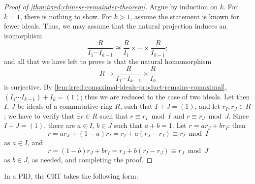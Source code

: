 \begin{proof}[Proof of \cref{thm:irred:chinese-remainder-theorem}]
  Argue by induction on $k$. For $k = 1$, there is nothing to
  show. For $k > 1$, assume the statement is known for fewer
  ideals. Thus, we may assume that the natural projection induces an
  isomorphism
  \[\frac{R}{I_1 \cdots I_{k-1}} \cong
    \frac{R}{I_1} \times \cdots \times \frac{R}{I_{k-1}};\] and all
  that we have left to prove is that the natural homomorphism
  \[R \to \frac{R}{I_1 \cdots I_{k-1}} \times \frac{R}{I_k}\] is
  surjective. By \cref{lem:irred:comaximal-ideals-product-remains-comaximal},
  $(I_1 \cdots I_{k-1}) + I_k = (1)$; thus we are reduced to the case
  of two ideals.  Let then $I$, $J$ be ideals of a commutative ring
  $R$, such that $I + J = (1)$, and let $r_I, r_J \in R$; we have to
  verify that $\exists r \in R$ such that $r \equiv r_I \bmod I$ and
  $r \equiv r_J \bmod J$.  Since $I + J = (1)$, there are $a \in I$,
  $b \in J$ such that $a + b = 1$.  Let $r = ar_J + br_I$: then
  \[r = ar_J + (1 - a)r_I = r_I + a(r_J - r_I) \equiv r_I \bmod I\] as
  $a \in I$, and
  \[r = (1 - b)r_J + br_I = r_J + b(r_I - r_J) \equiv r_J \bmod J\] as
  $b \in J$, as needed, and completing the proof.
\end{proof}
In a PID, the CRT takes the following form:

